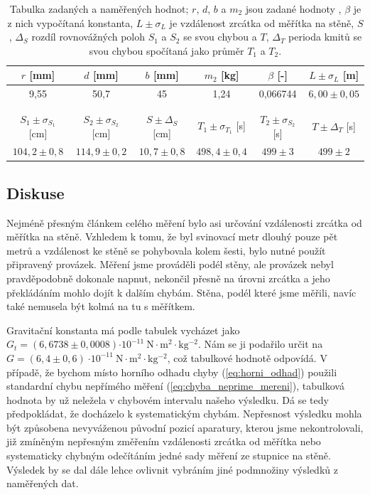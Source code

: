 \documentclass[english]{article}
\newcommand{\unit}[1]{\mathrm{#1}}
\begin{document}
		\begin{table}[h]
		\begin{center}
		
		\begin{tabular}{cccccc}
		\toprule
		$r$ [mm] & $d$ [mm] & $b$ [mm] & $m_2$ [kg] &	$\beta$ [-]& $L \pm \sigma_L$ [m] 		\\ \midrule
		9,55   	 & 50,7    	& 45  	   & 1,24  	    & 0,066744     & $6,00 \pm 0,05$ 	\\
		\midrule&&&&&\\  &&&&&\\ \midrule
		      $S_1 \pm \sigma_{S_1}$ [cm] 			& $S_2 \pm \sigma_{S_2}$ [cm]  		& $S \pm \Delta_S$ [cm]			& $T_1\pm\sigma_{T_1}$ [s] 		& $T_2\pm\sigma_{S_2}$ [s] & $T\pm\Delta_T$ [s] \\ \midrule
			 $104,2 \pm 0,8$ 	& $114,9 \pm 0,2 $ 	& $10,7 \pm  0,8$ 	& $498,4 \pm 0,4$ 	& $ 499 \pm 3$  & $499 \pm 2$\\
		\bottomrule
		\end{tabular}%
		\caption{Tabulka zadaných a naměřených hodnot; $r$, $d$, $b$ a $m_2$ jsou zadané hodnoty \cite{bib:zadani}, $\beta$ je z nich vypočítaná konstanta, $L \pm \sigma_L$ je vzdálenost zrcátka od měřítka na stěně, $S$, $\Delta_{S}$ rozdíl rovnovážných poloh $S_1$ a $S_2$ se svou chybou a $T$, $\Delta_T$ perioda kmitů se svou chybou spočítaná jako průměr $T_1$ a $T_2$.}
		\label{tab:1}
		\end{center}
		\end{table}			
	
	\subsection{Diskuse}
		Nejméně přesným článkem celého měření bylo asi určování vzdálenosti zrcátka od měřítka na stěně. Vzhledem k tomu, že byl svinovací metr dlouhý pouze pět metrů a vzdálenost ke stěně se pohybovala kolem šesti, bylo nutné použít připravený provázek. Měření jsme prováděli podél stěny, ale provázek nebyl pravděpodobně dokonale napnut, nekončil přesně na úrovni zrcátka a jeho překládáním mohlo dojít k dalším chybám. Stěna, podél které jsme měřili, navíc také nemusela být kolmá na tu s měřítkem. 
		
		Gravitační konstanta má podle tabulek \cite{bib:tabulky} vycházet jako $G_t = (6,6738 \pm 0,0008) \unit{\cdot 10^{-11}\ N\cdot m^2\cdot kg^{-2}}$. Nám se ji podařilo určit na $G = (6,4 \pm 0,6)\ \unit{\cdot 10^{-11}\ N\cdot m^2\cdot kg^{-2}}$, což tabulkové hodnotě odpovídá. V případě, že bychom místo horního odhadu chyby (\ref{eq:horni_odhad}) použili standardní chybu nepřímého měření (\ref{eq:chyba_neprime_mereni}), tabulková hodnota by už neležela v chybovém intervalu našeho výsledku. Dá se tedy předpokládat, že docházelo k systematickým chybám. Nepřesnost výsledku mohla být způsobena nevyváženou původní pozicí aparatury, kterou jsme nekontrolovali, již zmíněným nepřesným změřením vzdálenosti zrcátka od měřítka nebo systematicky chybným odečítáním jedné sady měření ze stupnice na stěně. Výsledek by se dal dále lehce ovlivnit vybráním jiné podmnožiny výsledků z naměřených dat. 
		
\end{document}
